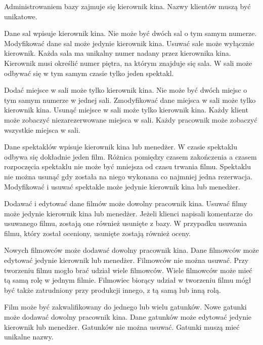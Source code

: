 \regula Administrowaniem bazy zajmuje się kierownik kina.
\regula Nazwy klientów muszą być unikatowe.

\regula Dane sal wpisuje kierownik kina.
\regula Nie może być dwóch sal o tym samym numerze.
\regula Modyfikować dane sal może jedynie kierownik kina.
\regula Usuwać sale może wyłącznie kierownik.
\regula Każda sala ma unikalny numer nadany przez kierownika kina.
\regula Kierownik musi określić numer piętra, na którym znajduje się sala.
\regula W sali może odbywać się w tym samym czasie tylko jeden spektakl.

\regula Dodać miejsce w sali może tylko kierownik kina.
\regula Nie może być dwóch miejsc o tym samym numerze w jednej sali.
\regula Zmodyfikować dane miejsca w sali może tylko kierownik kina.
\regula Usunąć miejsce w sali może tylko kierownik kina.
\regula Każdy klient może zobaczyć niezarezerwowane miejsca w sali.
\regula Każdy pracownik może zobaczyć wszystkie miejsca w sali.

\regula Dane spektaklów wpisuje kierownik kina lub menedżer.
\regula W czasie spektaklu odbywa się dokładnie jeden film.
\regula Różnica pomiędzy czasem zakończenia a czasem rozpoczęcia spektaklu nie może być mniejsza od czasu trwania filmu.
\regula Spektaklu nie można usunąć gdy została na niego wykonana co najmniej jedna rezerwacja.
\regula Modyfikować i usuwać spektakle może jedynie kierownik kina lub menedżer.

\regula Dodawać i edytować dane filmów może dowolny pracownik kina.
\regula Usuwać filmy może jedynie kierownik kina lub menedżer.
\regula Jeżeli klienci napisali komentarze do usuwanego filmu, zostają one również usunięte z bazy.
\regula W przypadku usuwania filmu, który został oceniony, usunięte zostają również oceny.

\regula Nowych filmowców może dodawać dowolny pracownik kina.
\regula Dane filmowców może edytować jedynie kierownik lub menedżer.
\regula Filmowców nie można usuwać.
\regula Przy tworzeniu filmu mogło brać udział wiele filmowców.
\regula Wiele filmowców może mieć tą samą rolę w jednym filmie.
\regula Filmowiec biorący udział w tworzeniu filmu mógł być także zatrudniony przy produkcji innego, z tą samą lub inną rolą.

\regula Film może być zakwalifikowany do jednego lub wielu gatunków.
\regula Nowe gatunki może dodawać dowolny pracownik kina.
\regula Dane gatunków może edytować jedynie kierownik lub menedżer.
\regula Gatunków nie można usuwać.
\regula Gatunki muszą mieć unikalne nazwy.

